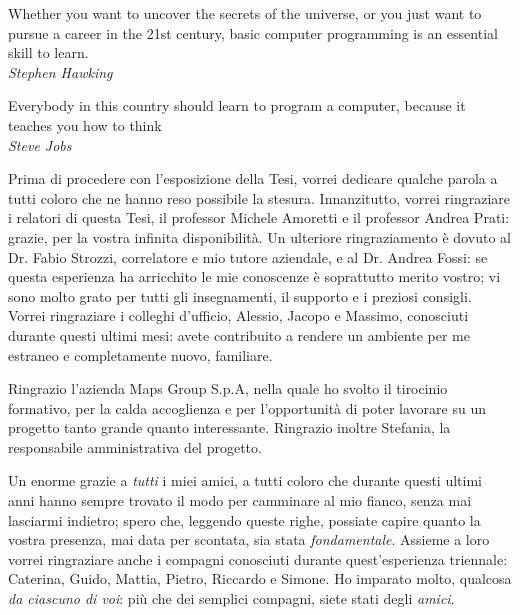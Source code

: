 \documentclass[
    corpo=11pt,
    twoside,
]{toptesi}
\begin{document}

\begin{flushright}
  \noindent
  Whether you want to uncover the secrets of the universe, or you just want to pursue a career in the 21st century, basic computer programming is an essential skill to learn.\\
  \vspace{5px}
  \small{\textit{Stephen Hawking}}
\end{flushright}
\begin{flushright}
  \noindent
  Everybody in this country should learn to program a computer, because it teaches you how to think\\
  \vspace{5px}
  \small{\textit{Steve Jobs}}
\end{flushright}
\cleardoublepage


\ringraziamenti
Prima di procedere con l'esposizione della Tesi, vorrei dedicare qualche parola a tutti coloro che ne hanno reso possibile la stesura. Innanzitutto, vorrei ringraziare i relatori di questa Tesi, il professor Michele Amoretti e il professor Andrea Prati: grazie, per la vostra infinita disponibilità. Un ulteriore ringraziamento è dovuto al Dr. Fabio Strozzi, correlatore e mio tutore aziendale, e al Dr. Andrea Fossi: se questa esperienza ha arricchito le mie conoscenze è soprattutto merito vostro; vi sono molto grato per tutti gli insegnamenti, il supporto e i preziosi consigli. Vorrei ringraziare i colleghi d'ufficio, Alessio, Jacopo e Massimo, conosciuti durante questi ultimi mesi: avete contribuito a rendere un ambiente per me estraneo e completamente nuovo, familiare. 

Ringrazio l'azienda Maps Group S.p.A, nella quale ho svolto il tirocinio formativo, per la calda accoglienza e per l'opportunità di poter lavorare su un progetto tanto grande quanto interessante. 
Ringrazio inoltre Stefania, la responsabile amministrativa del progetto. 

Un enorme grazie a \emph{tutti} i miei amici, a tutti coloro che durante questi ultimi anni hanno sempre trovato il modo per camminare al mio fianco, senza mai lasciarmi indietro; spero che, leggendo queste righe, possiate capire quanto la vostra presenza, mai data per scontata, sia stata \emph{fondamentale}. Assieme a loro vorrei ringraziare anche i compagni conosciuti durante quest'esperienza triennale: Caterina, Guido, Mattia, Pietro, Riccardo e Simone. Ho imparato molto, qualcosa \emph{da ciascuno di voi}: più che dei semplici compagni, siete stati degli \emph{amici}. 
\end{document}
